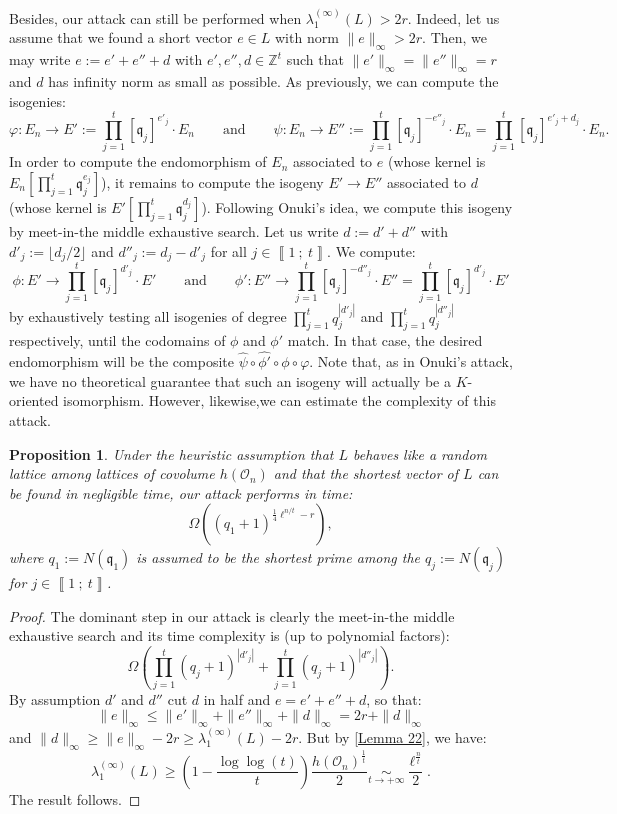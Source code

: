 \documentclass[a4paper,10pt]{report}
\theoremstyle{definition}
\theoremstyle{plain}
\newtheorem{Proposition}[Definition]{Proposition}
\theoremstyle{definition}
\newcommand{\Z}{\mathbb{Z}}
\newcommand{\mO}{\mathcal{O}}
\renewcommand{\i}[2]{\left\llbracket #1~;~#2\right\rrbracket}
\renewcommand{\(}{\left(}
\renewcommand{\)}{\right)}
\newcommand{\mf}[1]{\mathfrak{#1}}
\begin{document}
Besides, our attack can still be performed when $\lambda_1^{(\infty)}(L)>2r$. Indeed, let us assume that we found a short vector $e\in L$ with norm $\|e\|_\infty>2r$. Then, we may write $e:=e'+e''+d$ with $e', e'', d\in\Z^t$ such that $\|e'\|_\infty=\|e''\|_\infty=r$ and $d$ has infinity norm as small as possible. As previously, we can compute the isogenies:
\[\varphi : E_n \longrightarrow E':=\prod_{j=1}^t[\mf{q}_j]^{e'_j}\cdot E_n \qquad \mbox{and} \qquad \psi : E_n  \longrightarrow  E'':=\prod_{j=1}^t[\mf{q}_j]^{-e''_j}\cdot E_n=\prod_{j=1}^t[\mf{q}_j]^{e'_j+d_j}\cdot E_n.\]
In order to compute the endomorphism of $E_n$ associated to $e$ (whose kernel is $E_n[\prod_{j=1}^t \mf{q}_j^{e_j}]$), it remains to compute the isogeny $E'\longrightarrow E''$ associated to $d$ (whose kernel is $E'[\prod_{j=1}^t\mf{q}_j^{d_j}]$). Following Onuki's idea, we compute this isogeny by meet-in-the middle exhaustive search. Let us write $d:=d'+d''$ with $d'_j:=\lfloor d_j/2\rfloor$ and $d''_j:=d_j-d'_j$ for all $j\in\i{1}{t}$. We compute:
\[\phi: E'\longrightarrow \prod_{j=1}^t [\mf{q}_j]^{d'_j}\cdot E' \qquad \mbox{and} \qquad \phi': E''\longrightarrow \prod_{j=1}^t [\mf{q}_j]^{-d''_j}\cdot E''=\prod_{j=1}^t [\mf{q}_j]^{d'_j}\cdot E'\]
by exhaustively testing all isogenies of degree $\prod_{j=1}^t q_j^{|d'_j|}$ and $\prod_{j=1}^t q_j^{|d''_j|}$ respectively, until the codomains of $\phi$ and $\phi'$ match. In that case, the desired endomorphism will be the composite $\widehat{\psi}\circ\widehat{\phi'}\circ\phi\circ\varphi$. Note that, as in Onuki's attack, we have no theoretical guarantee that such an isogeny will actually be a $K$-oriented isomorphism. However, likewise,we can estimate the complexity of this attack.

\begin{Proposition}
Under the heuristic assumption that $L$ behaves like a random lattice among lattices of covolume $h(\mO_n)$ and that the shortest vector of $L$ can be found in negligible time, our attack performs in time:
\[\Omega\((q_1+1)^{\frac{1}{4}\ell^{n/t}-r}\),\]
where $q_1:=N(\mf{q}_1)$ is assumed to be the shortest prime among the $q_j:=N(\mf{q}_j)$ for $j\in\i{1}{t}$.
\end{Proposition} 

\begin{proof}
The dominant step in our attack is clearly the meet-in-the middle exhaustive search and its time complexity is (up to polynomial factors):
\[\Omega\(\prod_{j=1}^t (q_j+1)^{|d'_j|}+\prod_{j=1}^t (q_j+1)^{|d''_j|}\).\]
By assumption $d'$ and $d''$ cut $d$ in half and $e=e'+e''+d$, so that:
\[\|e\|_\infty\leq \|e'\|_\infty+\|e''\|_\infty+\|d\|_\infty=2r+\|d\|_\infty\]
and $\|d\|_\infty\geq \|e\|_\infty-2r\geq \lambda_1^{(\infty)}(L)-2r$.  But by \ref{Lemma 22}, we have:
\[\lambda_1^{(\infty)}(L)\geq \(1-\frac{\log\log(t)}{t}\)\frac{h(\mO_n)^{\frac{1}{t}}}{2}\underset{t\rightarrow +\infty}{\sim}\frac{\ell^{\frac{n}{t}}}{2}.\]
The result follows.
\end{proof}
\end{document}
